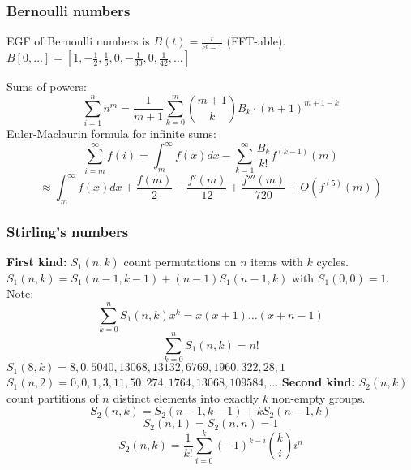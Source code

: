 \documentclass[
	a4paper,
	landscape,
	10pt,
]{article}
\begin{document}
\begin{multicols}{3}
	\subsubsection*{Bernoulli numbers}
		EGF of Bernoulli numbers is $B(t)=\frac{t}{e^t-1}$ (FFT-able).
		$B[0,\ldots] = [1, -\frac{1}{2}, \frac{1}{6}, 0, -\frac{1}{30}, 0, \frac{1}{42}, \ldots]$

		Sums of powers:
		\small
		\[ \sum_{i=1}^n n^m = \frac{1}{m+1} \sum_{k=0}^m \binom{m+1}{k} B_k \cdot (n+1)^{m+1-k} \]
		\normalsize
		Euler-Maclaurin formula for infinite sums:
		\small
		\[ \sum_{i=m}^{\infty} f(i) = \int_m^\infty f(x) dx - \sum_{k=1}^\infty \frac{B_k}{k!}f^{(k-1)}(m) \]
		\[ \approx \int_{m}^\infty f(x)dx + \frac{f(m)}{2} - \frac{f'(m)}{12} + \frac{f'''(m)}{720} + O(f^{(5)}(m)) \]
		\normalsize

	\subsubsection*{Stirling's numbers} \textbf{First kind:} $S_1(n, k)$ count permutations on $n$ items
		with $k$ cycles. $S_1(n, k) = S_1(n-1, k-1) + (n-1)S_1(n-1, k)$ with
		$S_1(0, 0) = 1$. Note:
		$$\sum_{k=0}^n S_1(n, k)x^k = x(x+1)\dots(x+n-1)$$
		$$ \sum_{k=0}^n S_1(n, k) = n! $$
		$S_1(8,k) = 8, 0, 5040, 13068, 13132, 6769, 1960, 322, 28, 1$ \\
		$S_1(n,2) = 0, 0, 1, 3, 11, 50, 274, 1764, 13068, 109584, \dots$
		\textbf{Second kind:} $S_2(n, k)$ count partitions of $n$
		distinct elements into exactly $k$ non-empty groups.
		$$ S_2(n, k) = S_2(n-1, k-1) + kS_2(n-1, k)$$
		$$S_2(n, 1) = S_2(n, n) = 1$$
		$$ S_2(n, k) = \frac{1}{k!}\sum_{i=0}^k (-1)^{k-i}\binom{k}{i}i^n $$



\end{multicols}
\end{document}
